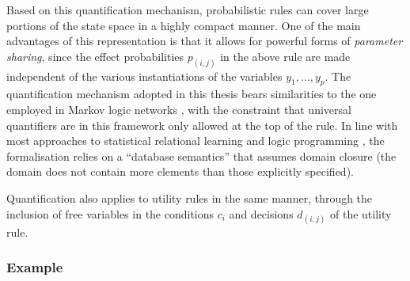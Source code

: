 Based on this quantification mechanism, probabilistic rules can cover large portions of the state space in a highly compact manner. One of the main advantages of this representation is that it allows for powerful forms of \textit{parameter sharing}, since the effect probabilities $p_{(i,j)}$ in the above rule are made independent of the various instantiations of the variables $y_1, \dots, y_p$.  The quantification mechanism adopted in this thesis bears similarities to the one employed in Markov logic networks \citep{Richardson:2006}, with the constraint that universal quantifiers are in this framework only allowed at the top of the rule.  In line with most approaches to statistical relational learning \citep{getoor:srlbook07} and logic programming \citep{Poole:2008}, the formalisation relies on a ``database semantics'' that assumes domain closure (the domain does not contain more elements than those explicitly specified). 

Quantification also applies to utility rules in the same manner, through the inclusion of free variables in the conditions $c_i$ and decisions $d_{(i,j)}$  of the utility rule. 

\subsubsection*{Example}

